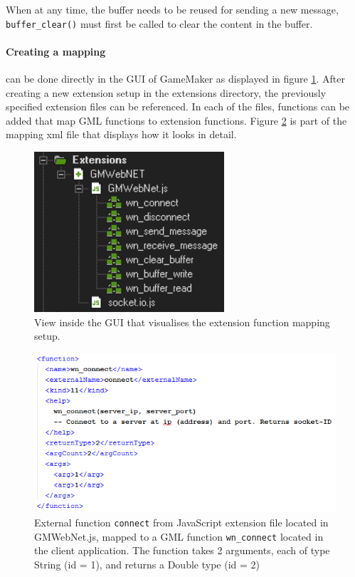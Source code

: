 \documentclass[bsc,frontabs,twoside,singlespacing,parskip,deptreport]{infthesis}     %
\begin{document}
When at any time, the buffer needs to be reused for sending a new message, \texttt{buffer\_clear()} must first be called to clear the content in the buffer. 

\paragraph*{Creating a mapping}
can be done directly in the GUI of GameMaker as displayed in figure \ref{fig:extension_folder}. After creating a new extension setup in the extensions directory, the previously specified extension files can be referenced. In each of the files, functions can be added that map GML functions to extension functions. Figure \ref{fig:xml_mapping} is part of the mapping xml file that displays how it looks in detail.

\begin{figure}[H]
\centering
\includegraphics[scale=1.2]{images/extensions_folder.png}
\caption{View inside the GUI that visualises the extension function mapping setup.}
\label{fig:extension_folder}
\vspace{1em}
\end{figure}

\begin{figure}[H]
\centering
\includegraphics[scale=1.2]{images/xml_mapping.png}
\caption{External function \texttt{connect} from JavaScript extension file located in GMWebNet.js, mapped to a GML function \texttt{wn\_connect} located in the client application. The function takes 2 arguments, each of type String (id = 1), and returns a Double type (id = 2)}
\label{fig:xml_mapping}
\vspace{1em}
\end{figure}
\end{document}
